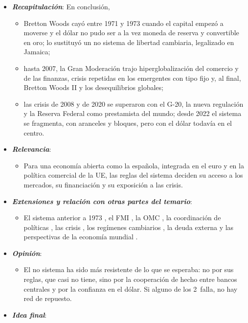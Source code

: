\documentclass[11pt]{article}
\begin{document}
\begin{itemize}
\item \textbf{\emph{Recapitulación}}: En conclusión,
  \begin{itemize}
  \item Bretton Woods cayó entre 1971 y 1973 cuando el capital empezó a moverse y el dólar no pudo ser a la vez moneda de reserva y convertible en oro; lo sustituyó un no sistema de libertad cambiaria, legalizado en Jamaica;
  \item hasta 2007, la Gran Moderación trajo hiperglobalización del comercio y de las finanzas, crisis repetidas en los emergentes con tipo fijo y, al final, Bretton Woods II y los desequilibrios globales;
  \item las crisis de 2008 y de 2020 se superaron con el G-20, la nueva regulación y la Reserva Federal como prestamista del mundo; desde 2022 el sistema se fragmenta, con aranceles y bloques, pero con el dólar todavía en el centro.
  \end{itemize}
\item \textbf{\emph{Relevancia}}:
  \begin{itemize}
  \item Para una economía abierta como la española, integrada en el euro y en la política comercial de la UE, las reglas del sistema deciden su acceso a los mercados, su financiación y su exposición a las crisis.
  \end{itemize}
\item \textbf{\emph{Extensiones y relación con otras partes del temario}}:
  \begin{itemize}
  \item El sistema anterior a 1973 , el FMI , la OMC , la coordinación de políticas , las crisis  , los regímenes cambiarios , la deuda externa  y las perspectivas de la economía mundial .
  \end{itemize}
\item \textbf{\emph{Opinión}}:
  \begin{itemize}
  \item El no sistema ha sido más resistente de lo que se esperaba: no por sus reglas, que casi no tiene, sino por la cooperación de hecho entre bancos centrales y por la confianza en el dólar. Si alguno de los 2~falla, no hay red de repuesto.
  \end{itemize}
\item \textbf{\emph{Idea final}}:

\end{itemize}
\end{document}
